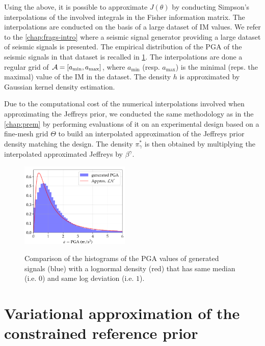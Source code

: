 Using the above, it is possible to approximate $J(\theta)$ by conducting Simpson's interpolations of the involved integrals in the Fisher information matrix. The interpolations are conducted on the basis of a large dataset of IM values. We refer to the \cref{chap:frags-intro} where a seismic signal generator providing a large dataset of seismic signals is presented. The empirical distribution of the PGA of the seismic signals in that dataset is recalled in \cref{fig:constr-frags:PGA}. %
The interpolations are done a regular grid of $\mathcal{A}=[a_{\min},a_{\max}]$, where $a_{\min}$ (resp. $a_{\max}$) is the minimal (reps. the maximal) value of the IM in the dataset.
The density $h$ is approximated by Gaussian kernel density estimation. 

Due to the computational cost of the numerical interpolations involved when approximating the Jeffreys prior, we conducted the same methodology as in the \cref{chap:prem} by performing  evaluations of it on an experimental design based on a fine-mesh grid $\Theta$ to build an interpolated approximation of the Jeffreys prior density matching the design.
The density $\pi^\ast_\gamma$ is then obtained by multiplying the interpolated approximated Jeffreys by $\beta^\gamma$.

\begin{figure}[h]
    \centering
    \includegraphics[width=5.2cm]{figures/constr-frags/pgadistrib.pdf}
    \label{fig:constr-frags:PGA}
    \caption{%
    Comparison of the histograms of the PGA values of generated signals (blue) with a lognormal
    density (red) that has same median (i.e. $0$) and same log deviation (i.e. $1$).}
\end{figure}





\section{Variational approximation of the constrained reference prior}\label{sec:constr-frags:varp}


